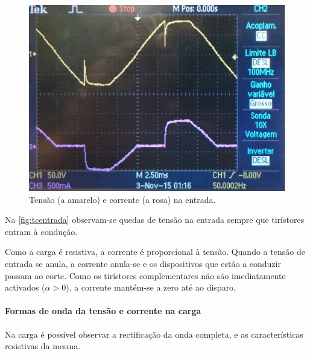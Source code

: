 \documentclass[a4paper,11pt]{article}
\numberwithin{equation}{section}
\begin{document}
\begin{figure}[H]
	\centering
	\includegraphics[keepaspectratio=true, scale=0.12]{img/DSC_0181}
	\caption{Tensão (a amarelo) e corrente (a rosa) na entrada.}
	\label{fig:tcentrada}
	\vspace{-0.8em}
\end{figure}

Na \autoref{fig:tcentrada} observam-se quedas de tensão na entrada sempre que tirístores entram à condução. 

Como a carga é resistiva, a corrente é proporcional à tensão. Quando a tensão de entrada se anula, a corrente anula-se e os dispositivos que estão a conduzir passam ao corte. Como os tirístores complementares não são imediatamente activados ($\alpha > 0$), a corrente mantém-se a zero até ao disparo.

\paragraph{Formas de onda da tensão e corrente na carga} 

Na carga é possível observar a rectificação da onda completa, e as características resistivas da mesma.
\end{document}

